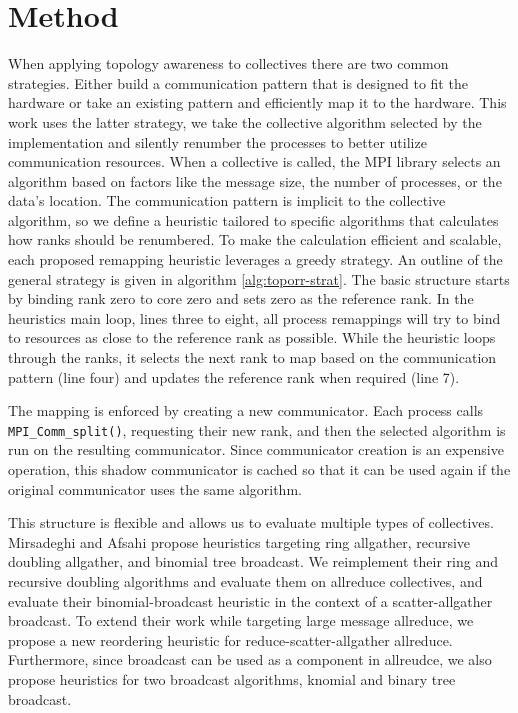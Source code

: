\section{Method}
When applying topology awareness to collectives there are two common strategies.
Either build a communication pattern that is designed to fit the hardware or take an existing pattern and efficiently map it to the hardware.
This work uses the latter strategy, we take the collective algorithm selected by the implementation and silently renumber the processes to better utilize communication resources.
When a collective is called, the MPI library selects an algorithm based on factors like the message size, the number of processes, or the data's location.
The communication pattern is implicit to the collective algorithm, so we define a heuristic tailored to specific algorithms that calculates how ranks should be renumbered.
To make the calculation efficient and scalable, each proposed remapping heuristic leverages a greedy strategy.
An outline of the general strategy is given in algorithm \ref{alg:toporr-strat}.
The basic structure starts by binding rank zero to core zero and sets zero as the reference rank.
In the heuristics main loop, lines three to eight, all process remappings will try to bind to resources as close to the reference rank as possible.
While the heuristic loops through the ranks, it selects the next rank to map based on the communication pattern (line four) and updates the reference rank when required (line 7).

The mapping is enforced by creating a new communicator.
Each process calls \texttt{MPI\_Comm\_split()}, requesting their new rank, and then the selected algorithm is run on the resulting communicator.
Since communicator creation is an expensive operation, this shadow communicator is cached so that it can be used again if the original communicator uses the same algorithm.

This structure is flexible and allows us to evaluate multiple types of collectives.
Mirsadeghi and Afsahi \cite{Mirsadeghi2016TopoAwareCollRR} propose heuristics targeting ring allgather, recursive doubling allgather, and binomial tree broadcast. 
We reimplement their ring and recursive doubling algorithms and evaluate them on allreduce collectives, and evaluate their binomial-broadcast heuristic in the context of a scatter-allgather broadcast.
To extend their work while targeting large message allreduce, we propose a new reordering heuristic for reduce-scatter-allgather allreduce.
Furthermore, since broadcast can be used as a component in allreudce, we also propose heuristics for two broadcast algorithms, knomial and binary tree broadcast.

